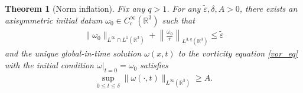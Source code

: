 \documentclass[reqno,11pt]{amsart}
\newtheorem{theorem}{Theorem}[section]
\begin{document}
\begin{theorem}[Norm inflation]
\label{main_thm1}
    Fix any $q>1$. For any $\tilde \varepsilon, \delta, A>0$, there exists an axisymmetric initial datum $\omega_0 \in C_c^\infty (\mathbb{R}^3)$ such that 
        \begin{align*}
           \| \omega_0 \|_{L^\infty \cap L^{1}(\mathbb{R}^3)} 
        +
            \left\|
                \frac{\omega_0}{r}
            \right\|_{L^{3,q}(\mathbb{R}^3) } 
            \leq  \tilde \varepsilon
        \end{align*}
    and the unique global-in-time solution $\omega (x,t)$ to the vorticity equation \eqref{vor_eq} with the initial condition $\omega|_{t=0}=\omega_0$ satisfies
        \begin{align*}
            \sup _{0\leq t \leq \delta} 
            \|\omega (\cdot,t) \|_{L^\infty (\mathbb{R}^3)} \geq A.
        \end{align*}
\end{theorem}
\end{document}
